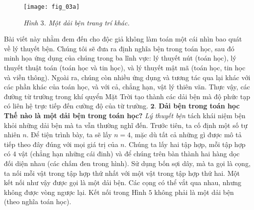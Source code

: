 \begin{multicols}{2}
\begin{figure}[H]
		\texttt{[image: fig\_03a]}
		\caption{\small\textit{\color{duongvaotoanhoc}Hình $3$. Một dải bện trang trí khác.}}
		\vspace*{-10pt}
	\end{figure}
	Bài viết này nhằm đem đến cho độc giả không làm toán một cái nhìn bao quát về lý thuyết bện. Chúng tôi sẽ đưa ra định nghĩa bện trong toán học, sau đó minh họa ứng dụng của chúng trong ba lĩnh vực: lý thuyết nút (toán học), lý thuyết thuật toán (toán học và tin học), và lý thuyết mật mã (toán học, tin học và viễn thông). Ngoài ra, chúng còn nhiều ứng dụng và tương tác qua lại khác với các phần khác của toán học, và với cả, chẳng hạn, vật lý thiên văn. Thực vậy, các đường từ trường trong khí quyển Mặt Trời tạo thành các dải bện mà độ phức tạp có liên hệ trực tiếp đến cường độ của từ trường.
	\vskip 0.1cm
	\vskip 0.1cm
	$\pmb{2.}$ \textbf{\color{duongvaotoanhoc}Dải bện trong toán học}
	\vskip 0.1cm
	\textbf{\color{duongvaotoanhoc}Thế nào là một dải bện trong toán học?}
	\vskip 0.1cm
	\textit{Lý thuyết bện} tách khái niệm bện khỏi những dải bện mà ta vẫn thường nghĩ đến. Trước tiên, ta cố định một số tự nhiên $n$. Để tiện trình bày, ta sẽ lấy $n = 4$, mặc dù tất cả những gì được mô tả tiếp theo đây đúng với mọi giá trị của $n$. Chúng ta lấy hai tập hợp, mỗi tập hợp có $4$ vật (chẳng hạn những cái đinh) và để chúng trên bàn thành hai hàng dọc đối diện nhau (các chấm đen trong hình). Sử dụng bốn sợi dây, mà ta gọi là cọng, ta nối mỗi vật trong tập hợp thứ nhất với một vật trong tập hợp thứ hai. Một kết nối như vậy được gọi là một dải bện. Các cọng có thể vắt qua nhau, nhưng không được vòng ngược lại. Kết nối trong Hình $5$ không phải là một dải bện (theo nghĩa toán học).

\end{multicols}
